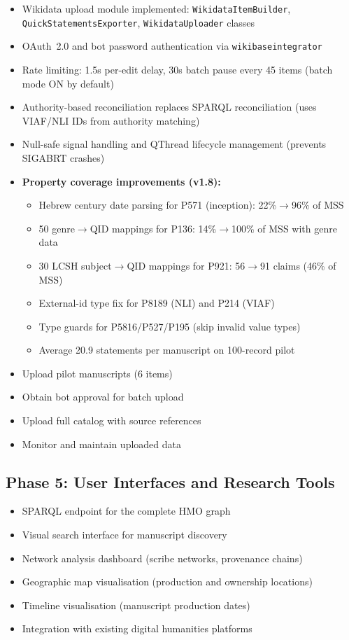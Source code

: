 \documentclass[12pt]{article}
\newcommand{\code}[1]{\texttt{#1}}
\begin{document}
\begin{itemize}
\item Wikidata upload module implemented: \code{WikidataItemBuilder}, \code{QuickStatementsExporter}, \code{WikidataUploader} classes
\item OAuth~2.0 and bot password authentication via \code{wikibaseintegrator}
\item Rate limiting: 1.5s per-edit delay, 30s batch pause every 45 items (batch mode ON by default)
\item Authority-based reconciliation replaces SPARQL reconciliation (uses VIAF/NLI IDs from authority matching)
\item Null-safe signal handling and QThread lifecycle management (prevents SIGABRT crashes)
\item \textbf{Property coverage improvements (v1.8):}
  \begin{itemize}
  \item Hebrew century date parsing for P571 (inception): 22\%$\to$96\% of MSS
  \item 50 genre$\to$QID mappings for P136: 14\%$\to$100\% of MSS with genre data
  \item 30 LCSH subject$\to$QID mappings for P921: 56$\to$91 claims (46\% of MSS)
  \item External-id type fix for P8189 (NLI) and P214 (VIAF)
  \item Type guards for P5816/P527/P195 (skip invalid value types)
  \item Average 20.9 statements per manuscript on 100-record pilot
  \end{itemize}
\item Upload pilot manuscripts (6 items)
\item Obtain bot approval for batch upload
\item Upload full catalog with source references
\item Monitor and maintain uploaded data
\end{itemize}

\subsection{Phase 5: User Interfaces and Research Tools}

\begin{itemize}
\item SPARQL endpoint for the complete HMO graph
\item Visual search interface for manuscript discovery
\item Network analysis dashboard (scribe networks, provenance chains)
\item Geographic map visualisation (production and ownership locations)
\item Timeline visualisation (manuscript production dates)
\item Integration with existing digital humanities platforms
\end{itemize}
\end{document}
